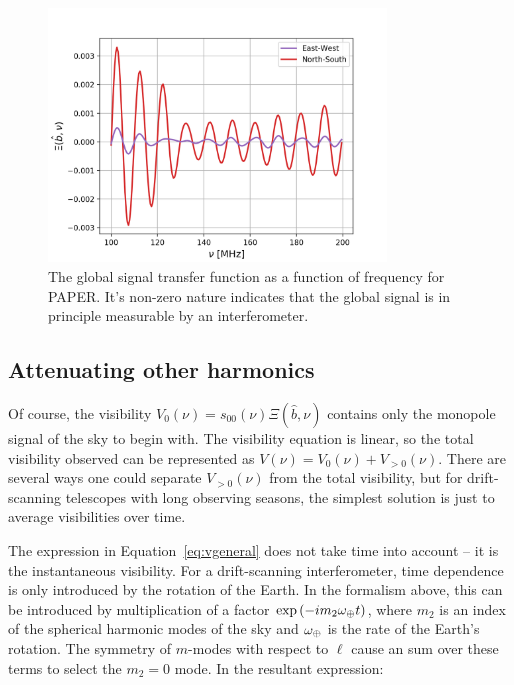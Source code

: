 \begin{figure}
\centering
\includegraphics[width=0.8\textwidth]{chapters/global_signal/figures/Xi_vis.png}
\caption[The global signal transfer function as a function of frequency for PAPER.]{The global signal transfer function as a function of frequency for PAPER. It's non-zero nature indicates that the global signal is in principle measurable by an interferometer. 
}
\label{fig:xi_vis}
\end{figure}

\subsection{Attenuating other harmonics}

Of course, the visibility $V_0(\nu) = s_{00}(\nu)\Xi(\hat{b},\nu)$ contains only the monopole signal of the sky to begin with. The visibility equation is linear, so the total visibility observed can be represented as $V(\nu) = V_0(\nu) + V_{>0}(\nu)$. There are several ways one could separate $V_{>0}(\nu)$ from the total visibility, but for drift-scanning telescopes with long observing seasons, the simplest solution is just to average visibilities over time. 

The expression in Equation~\ref{eq:vgeneral} does not take time into account -- it is the instantaneous visibility. For a drift-scanning interferometer, time dependence is only introduced by the rotation of the Earth. In the formalism above, this can be introduced by multiplication of a factor $\exp\left(-i m_2 \omega_{\oplus} t\right)$, where $m_2$ is an index of the spherical harmonic modes of the sky and $\omega_{\oplus}$ is the rate of the Earth's rotation. The symmetry of $m$-modes with respect to $\ell$ cause an sum over these terms to select the $m_2=0$ mode. In the resultant expression:

